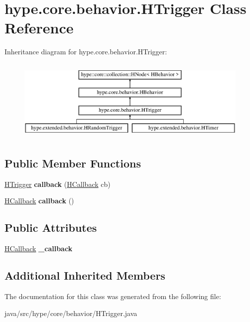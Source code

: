 \hypertarget{classhype_1_1core_1_1behavior_1_1_h_trigger}{\section{hype.\-core.\-behavior.\-H\-Trigger Class Reference}
\label{classhype_1_1core_1_1behavior_1_1_h_trigger}
}
Inheritance diagram for hype.\-core.\-behavior.\-H\-Trigger\-:\begin{figure}[H]
\begin{center}
\leavevmode
\includegraphics[height=4.000000cm]{classhype_1_1core_1_1behavior_1_1_h_trigger}
\end{center}
\end{figure}
\subsection*{Public Member Functions}
\begin{DoxyCompactItemize}
\item 
\hypertarget{classhype_1_1core_1_1behavior_1_1_h_trigger_ac011086834142625b2ed0dc214fbbdf1}{\hyperlink{classhype_1_1core_1_1behavior_1_1_h_trigger}{H\-Trigger} {\bfseries callback} (\hyperlink{interfacehype_1_1core_1_1interfaces_1_1_h_callback}{H\-Callback} cb)}\label{classhype_1_1core_1_1behavior_1_1_h_trigger_ac011086834142625b2ed0dc214fbbdf1}

\item 
\hypertarget{classhype_1_1core_1_1behavior_1_1_h_trigger_acad541d508e83362466da1ed782aa970}{\hyperlink{interfacehype_1_1core_1_1interfaces_1_1_h_callback}{H\-Callback} {\bfseries callback} ()}\label{classhype_1_1core_1_1behavior_1_1_h_trigger_acad541d508e83362466da1ed782aa970}

\end{DoxyCompactItemize}
\subsection*{Public Attributes}
\begin{DoxyCompactItemize}
\item 
\hypertarget{classhype_1_1core_1_1behavior_1_1_h_trigger_ab3c1145262d74f0a710516e31ac6994a}{\hyperlink{interfacehype_1_1core_1_1interfaces_1_1_h_callback}{H\-Callback} {\bfseries \-\_\-callback}}\label{classhype_1_1core_1_1behavior_1_1_h_trigger_ab3c1145262d74f0a710516e31ac6994a}

\end{DoxyCompactItemize}
\subsection*{Additional Inherited Members}


The documentation for this class was generated from the following file\-:\begin{DoxyCompactItemize}
\item 
java/src/hype/core/behavior/H\-Trigger.\-java\end{DoxyCompactItemize}
